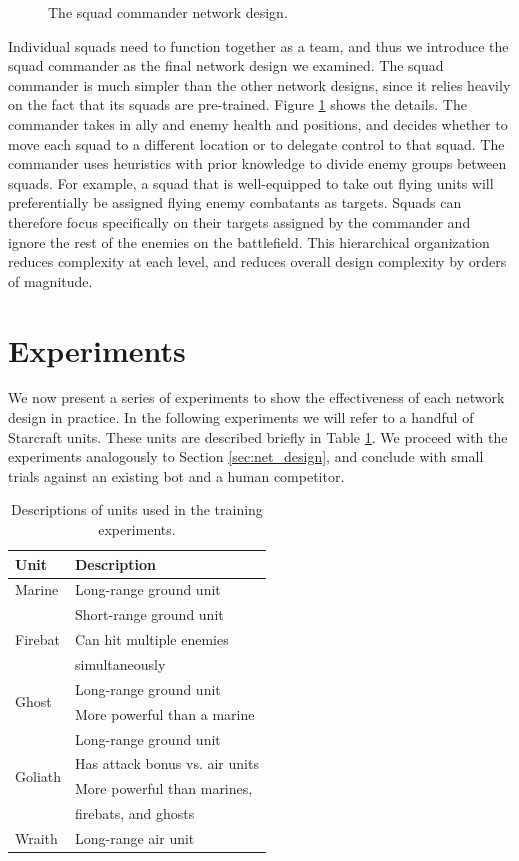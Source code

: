 \documentclass[10pt,a4paper,twocolumn]{article}
\begin{document}
\begin{figure}

\caption{The squad commander network design.}
\label{fig:quad_commander_design}
\end{figure}

Individual squads need to function together as a team, and thus we introduce the squad commander as the final network design we examined. The squad commander is much simpler than the other network designs, since it relies heavily on the fact that its squads are pre-trained. Figure \ref{fig:quad_commander_design} shows the details. The commander takes in ally and enemy health and positions, and decides whether to move each squad to a different location or to delegate control to that squad. The commander uses heuristics with prior knowledge to divide enemy groups between squads. For example, a squad that is well-equipped to take out flying units will preferentially be assigned flying enemy combatants as targets. Squads can therefore focus specifically on their targets assigned by the commander and ignore the rest of the enemies on the battlefield. This hierarchical organization reduces complexity at each level, and reduces overall design complexity by orders of magnitude.

\section{Experiments}
\label{sec:exp}

We now present a series of experiments to show the effectiveness of each network design in practice. In the following experiments we will refer to a handful of Starcraft units. These units are described briefly in Table \ref{tab:units}. We proceed with the experiments analogously to Section \ref{sec:net_design}, and conclude with small trials against an existing bot and a human competitor.

\begin{table}
\centering
\begin{tabular}{|l|l|}
	\hline
	{\bf Unit} & {\bf Description} \\ \hline
	Marine & Long-range ground unit \\ \hline
	\multirow{3}{*}{Firebat} & Short-range ground unit \\
	& Can hit multiple enemies \\
	& simultaneously \\ \hline
	\multirow{2}{*}{Ghost} & Long-range ground unit \\
	& More powerful than a marine\\ \hline
	\multirow{4}{*}{Goliath} & Long-range ground unit \\
	& Has attack bonus vs. air units \\
	& More powerful than marines, \\
	& firebats, and ghosts \\ \hline
	Wraith & Long-range air unit \\ \hline
\end{tabular}
\caption{Descriptions of units used in the training experiments.}
\label{tab:units}
\end{table}
	
\end{document}
